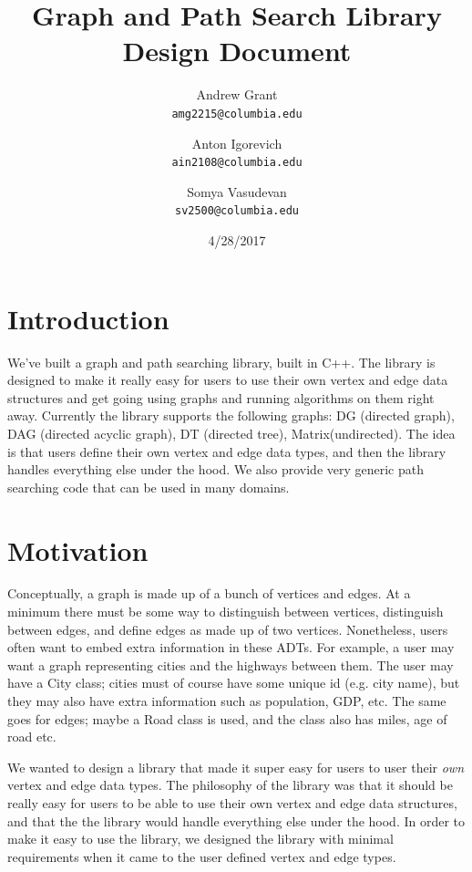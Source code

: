 \documentclass{article}
\title{Graph and Path Search Library Design Document}
\author{
Andrew Grant\\
\texttt{amg2215@columbia.edu}
\and 
Anton Igorevich \\
\texttt{ain2108@columbia.edu}
\and
 Somya Vasudevan \\
 \texttt{sv2500@columbia.edu}
}
\date{4/28/2017}
\begin{document}
\maketitle

\section{Introduction}
We've built a graph and path searching library, built in C++. The library is designed to make it really easy for users to use their own vertex and edge data structures and get going using graphs and running algorithms on them right away. Currently the library supports the following graphs: DG (directed graph), DAG (directed acyclic graph), DT (directed tree), Matrix(undirected). The idea is that users define their own vertex and edge data types, and then the library handles everything else under the hood. We also provide very generic path searching code that can be used in many domains. 

\section{Motivation}
Conceptually, a graph is made up of a bunch of vertices and edges. At a minimum there must be some way to distinguish between vertices, distinguish between edges, and define edges as made up of two vertices. Nonetheless, users often want to embed extra information in these ADTs. For example, a user may want a graph representing cities and the highways between them. The user may have a City class; cities must of course have some unique id (e.g. city name), but they may also have extra information such as population, GDP, etc. The same goes for edges; maybe a Road class is used, and the class also has miles, age of road etc. 
\par
We wanted to design a library that made it super easy for users to user their \emph{own} vertex and edge data types.
The philosophy of the library was that it should be really easy for users to be able to use their own vertex and edge data structures, and that the the library would handle everything else under the hood. In order to make it easy to use the library, we designed the library with minimal requirements when it came to the user defined vertex and edge types. 
\end{document}

